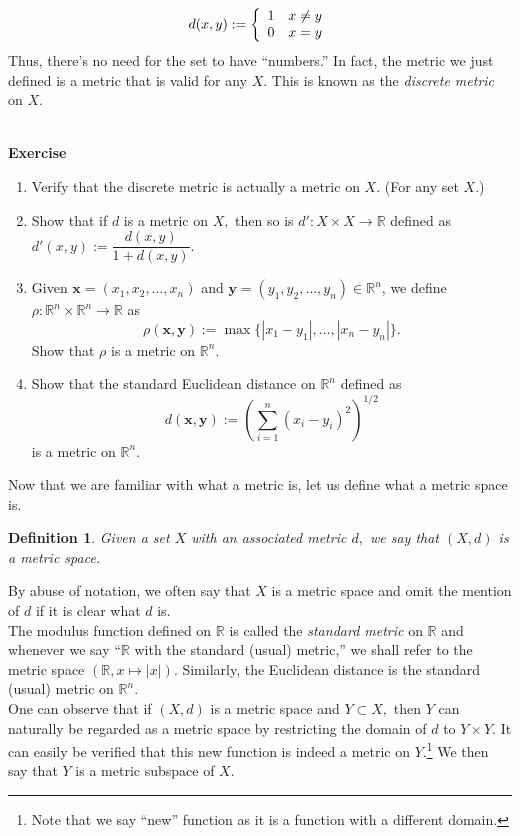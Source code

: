 \documentclass[12pt]{article}
\newtheorem{defn}{Definition}
\newcounter{exercise}
\newcommand{\exercise}{\refstepcounter{exercise}\par\medskip
   {\textbf{Exercise \theexercise }} \rmfamily}
\begin{document}
	\[d(x, y) := \left\{\begin{array}{c r}
		1 & x \neq y\\
		0 & x = y
	\end{array}
	\right.\]
	Thus, there's no need for the set to have ``numbers.'' In fact, the metric we just defined is a metric that is valid for any $X.$ This is known as the \emph{discrete metric} on $X.$\\~\\
	\exercise
	\begin{enumerate}[nosep]\label{ex:standard-metrics}
		\item Verify that the discrete metric is actually a metric on $X.$ (For any set $X.$)
		\item Show that if $d$ is a metric on $X,$ then so is $d' : X \times X \to \mathbb{R}$ defined as $d'(x, y) := \dfrac{d(x, y)}{1 + d(x, y)}.$
		\item Given $\textbf{x} = (x_1, x_2, \ldots, x_n)$ and $\textbf{y} = (y_1, y_2, \ldots, y_n) \in \mathbb{R}^n$, we define $\rho:\mathbb{R}^n\times \mathbb{R}^n \to \mathbb{R}$ as
		\[\rho(\textbf{x}, \textbf{y}) := \max\{|x_1 - y_1|, \ldots, |x_n - y_n|\}.\]
		Show that $\rho$ is a metric on $\mathbb{R}^n.$
		\item Show that the standard Euclidean distance on $\mathbb{R}^n$ defined as 
		\[d(\textbf{x}, \textbf{y}) := \left(\sum_{i=1}^{n}(x_i - y_i)^2\right)^{1/2}\]
		is a metric on $\mathbb{R}^n.$
	\end{enumerate}
	Now that we are familiar with what a metric is, let us define what a metric space is.
	\begin{defn}
		Given a set $X$ with an associated metric $d,$ we say that $(X, d)$ is a metric space.
	\end{defn}
	By abuse of notation, we often say that $X$ is a metric space and omit the mention of $d$ if it is clear what $d$ is.\\
	The modulus function defined on $\mathbb{R}$ is called the \emph{standard metric} on $\mathbb{R}$ and whenever we say ``$\mathbb{R}$ with the standard (usual) metric,'' we shall refer to the metric space $(\mathbb{R}, x \mapsto |x|).$ Similarly, the Euclidean distance is the standard (usual) metric on $\mathbb{R}^n.$\\
	One can observe that if $(X, d)$ is a metric space and $Y \subset X,$ then $Y$ can naturally be regarded as a metric space by restricting the domain of $d$ to $Y \times Y.$ It can easily be verified that this new function is indeed a metric on $Y.$\footnote{Note that we say ``new'' function as it is a function with a different domain.} We then say that $Y$ is a metric subspace of $X.$
\end{document}
